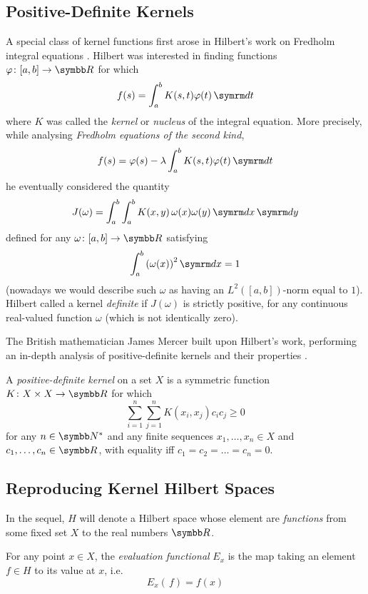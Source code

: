 \subsection{Positive-Definite Kernels}

A special class of kernel functions first arose in Hilbert's work on Fredholm integral equations \cite{Hilbert1904_Part1, Hilbert1904_Part2}. Hilbert was interested in finding functions \(\varphi \colon [a, b] \to \reals\) for which
\[
    f(s) = \int_{a}^{b} K(s, t) \varphi(t) \diff t
\]
where \(K\) was called the \emph{kernel} or \emph{nucleus} of the integral equation. More precisely, while analysing \emph{Fredholm equations of the second kind},
\[
    f(s) = \varphi(s) - \lambda \int_{a}^{b} K(s, t) \varphi(t) \diff t
\]
he eventually considered the quantity
\[
    J(\omega) = \int_{a}^{b} \int_{a}^{b} K(x, y) \, \omega(x) \omega(y) \diff x \diff y
\]
defined for any \(\omega \colon [a, b] \to \reals\) satisfying
\[
    \int_{a}^{b} \left(\omega(x)\right)^2 \diff x = 1
\]
(nowadays we would describe such \(\omega\) as having an \(L^2 \left([a, b]\right)\)-norm equal to \(1\)). Hilbert called a kernel \emph{definite} if \(J(\omega)\) is strictly positive, for any continuous real-valued function \(\omega\) (which is not identically zero).

The British mathematician James Mercer built upon Hilbert's work, performing an in-depth analysis of positive-definite kernels and their properties \cite{Mercer1909}.

\begin{definition}
A \emph{positive-definite kernel} on a set \(X\) is a symmetric function \(K \colon X \times X \to \reals\) for which
\[
    \sum_{i = 1}^{n} \sum_{j = 1}^{n} K(x_i, x_j) c_i c_j \geq 0
\]
for any \(n \in \naturals^*\) and any finite sequences \(x_1, \dots, x_n \in X\) and \(c_1, \dots, c_n \in \reals\), with equality iff \(c_1 = c_2 = \dots = c_n = 0\).
\end{definition}

\subsection{Reproducing Kernel Hilbert Spaces}

In the sequel, \(H\) will denote a Hilbert space whose element are \emph{functions} from some fixed set \(X\) to the real numbers \(\reals\).

\begin{definition}
For any point \(x \in X\), the \emph{evaluation functional} \(E_x\) is the map taking an element \(f \in H\) to its value at \(x\), i.e.\
\[
    E_x \left(\, f \right) = f(x)
\]
\end{definition}

